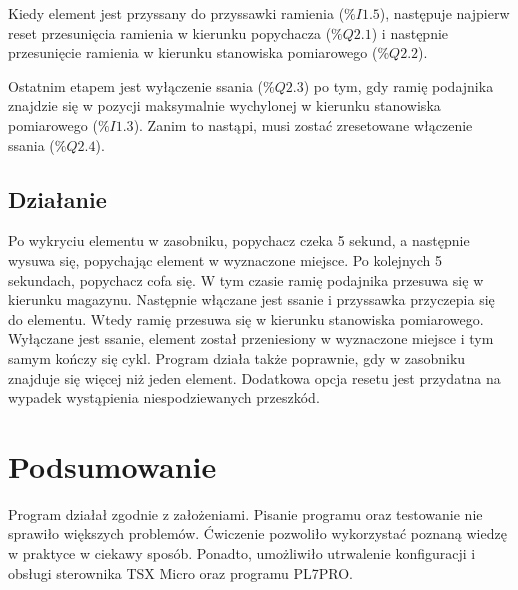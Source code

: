 \documentclass[12pt]{article}
\begin{document}
Kiedy element jest przyssany do przyssawki ramienia ($\%I1.5$), następuje najpierw reset przesunięcia ramienia w kierunku popychacza ($\%Q2.1$) i następnie przesunięcie ramienia w kierunku stanowiska pomiarowego ($\%Q2.2$).


Ostatnim etapem jest wyłączenie ssania ($\%Q2.3$) po tym, gdy ramię podajnika znajdzie się w pozycji maksymalnie wychylonej w kierunku stanowiska pomiarowego ($\%I1.3$). Zanim to nastąpi, musi zostać zresetowane włączenie ssania ($\%Q2.4$).


\subsection{Działanie}
Po wykryciu elementu w zasobniku, popychacz czeka 5 sekund, a następnie wysuwa się, popychając element w wyznaczone miejsce. Po kolejnych 5 sekundach, popychacz cofa się. W tym czasie ramię podajnika przesuwa się w kierunku magazynu. Następnie włączane jest ssanie i przyssawka przyczepia się do elementu. Wtedy ramię przesuwa się w kierunku stanowiska pomiarowego. Wyłączane jest ssanie, element został przeniesiony w wyznaczone miejsce i tym samym kończy się cykl. Program działa także poprawnie, gdy w zasobniku znajduje się więcej niż jeden element. Dodatkowa opcja resetu jest przydatna na wypadek wystąpienia niespodziewanych przeszkód.

\section{Podsumowanie}
Program działał zgodnie z założeniami. Pisanie programu oraz testowanie nie sprawiło większych problemów. Ćwiczenie pozwoliło wykorzystać poznaną wiedzę w praktyce w ciekawy sposób. Ponadto, umożliwiło utrwalenie konfiguracji i obsługi sterownika TSX Micro oraz programu PL7PRO.
\end{document}
